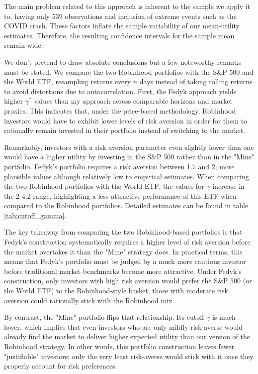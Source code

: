 The main problem related to this approach is inherent to the sample we apply it to, having only 539 observations and inclusion of extreme events such as the COVID crash. 
These factors inflate the sample variability of our mean-utility estimates. 
Therefore, the resulting confidence intervals for the sample mean remain wide. 

We don't pretend to draw absolute conclusions but a few noteworthy remarks must be stated.
We compare the two Robinhood portfolios with the S\&P 500 and the World ETF, resampling returns every $n$ days instead of taking rolling returns to avoid distortions due to autocorrelation. 
First, the Fedyk approach yields higher $\gamma^*$ values than my approach across comparable horizons and market proxies.
This indicates that, under the price-based methodology, Robinhood investors would have to exhibit lower levels of risk aversion in order for them to rationally remain invested in their portfolio instead of switching to the market.

Remarkably, investors with a risk aversion parameter even slightly lower than one would have a higher utility by investing in the S\&P 500 rather than in the "Mine" portfolio.
Fedyk's portfolio requires a risk aversion between 1.7 and 2; more plausible values although relatively low to empirical estimates.
When comparing the two Robinhood portfolios with the World ETF, the values for $\gamma$ increase in the 2-4.2 range, 
highlighting  a less attractive performance of this ETF when compared to the Robinhood portfolios.
Detailed estimates can be found in table \ref{tab:cutoff_gamma}.

The key takeaway from comparing the two Robinhood-based portfolios is that Fedyk's construction systematically requires a 
higher level of risk aversion before the market overtakes it than the "Mine" strategy does. 
In practical terms, this means that Fedyk's portfolio must be judged by a much more cautious investor before traditional market benchmarks become more attractive. 
Under Fedyk's construction, only investors with high risk aversion would prefer the S\&P 500 (or the World ETF) to the Robinhood-style basket; those with moderate risk aversion could rationally stick with the Robinhood mix.

By contrast, the "Mine" portfolio flips that relationship. 
Its cutoff $\gamma$ is much lower, which implies that even investors who are only mildly risk-averse would already find the market to deliver higher expected utility than our version of the Robinhood strategy. 
In other words, this portfolio construction leaves fewer "justifiable" investors: only the very least risk-averse would stick with it once they properly account for risk preferences.



